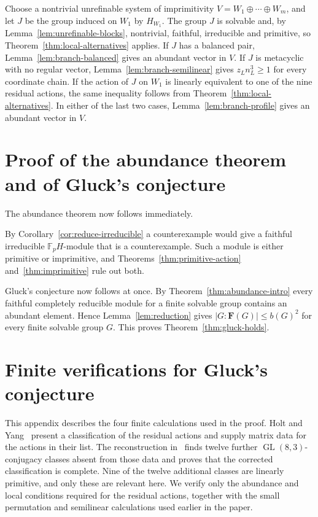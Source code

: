 \documentclass[10pt]{amsart}
\theoremstyle{definition}
\renewcommand{\le}{\leqslant}
\renewcommand{\geq}{\geqslant}
\let\oldendproof\endproof
\renewenvironment{proof}[1][\proofname]{%
  \oldproof[\bfseries #1]%
}{\oldendproof}
\DeclareMathOperator{\GL}{GL}
\numberwithin{equation}{section}
\numberwithin{table}{section}
\begin{document}
\begin{proof}
Choose a nontrivial unrefinable system of imprimitivity
$V=W_1\oplus\cdots\oplus W_m$, and let $J$ be the group induced on
$W_1$ by $H_{W_1}$. The group $J$ is solvable and, by
Lemma~\ref{lem:unrefinable-blocks}, nontrivial, faithful, irreducible and
primitive, so Theorem~\ref{thm:local-alternatives} applies. If $J$ has a
balanced pair, Lemma~\ref{lem:branch-balanced} gives an abundant vector in
$V$. If $J$ is metacyclic with no regular vector,
Lemma~\ref{lem:branch-semilinear} gives $z_Ln_L^3\geq1$ for every coordinate
chain. If the action of $J$ on $W_1$ is linearly equivalent to one of the nine residual actions,
the same inequality follows from Theorem~\ref{thm:local-alternatives}. In
either of the last two cases, Lemma~\ref{lem:branch-profile} gives an
abundant vector in $V$.
\end{proof}

\section{Proof of the abundance theorem and of Gluck's conjecture}
\label{sec:gaschutz}

The abundance theorem now follows immediately.

\begin{proof}[Proof of Theorem~\ref{thm:abundance-intro}]
By Corollary~\ref{cor:reduce-irreducible} a counterexample would give a faithful
irreducible $\mathbb{F}_pH$-module that is a counterexample. Such a module is either
primitive or imprimitive, and Theorems~\ref{thm:primitive-action}
and~\ref{thm:imprimitive} rule out both.
\end{proof}

Gluck's conjecture now follows at once. By Theorem~\ref{thm:abundance-intro}
every faithful completely reducible module for a finite solvable group contains an
abundant element. Hence Lemma~\ref{lem:reduction} gives
$|G:\mathbf{F}(G)|\le b(G)^2$ for every finite solvable group $G$. This proves
Theorem~\ref{thm:gluck-holds}.

\appendix

\section{Finite verifications for Gluck's conjecture}
\label{sec:computations}

This appendix describes the four finite calculations used in the proof.
Holt and Yang~\cite{HY23} present a classification of the residual actions
and supply matrix data for the actions in their list. The reconstruction
in~\cite{ZhangRegularOrbits26} finds twelve further
$\GL(8,3)$-conjugacy classes absent from those data and proves that the
corrected classification is complete. Nine of the twelve additional classes
are linearly primitive, and only these are relevant here. We verify only the
abundance and local conditions required for the residual actions, together with
the small permutation and semilinear calculations used earlier in the paper.
\end{document}

